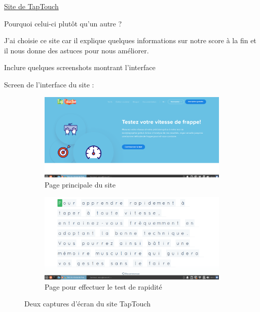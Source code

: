 \documentclass[12pt]{article}
\begin{document}
\href{https://www.taptouche.com/fr/test-de-vitesse}{Site de TapTouch}

\vspace{0.3cm}

Pourquoi celui-ci plutôt qu'un autre ?

\vspace{0.3cm}

J'ai choisie ce site car il explique quelques informations sur notre score à la fin et il nous donne des astuces pour nous améliorer.

\vspace{0.3cm}

Inclure quelques screenshots montrant l'interface

\vspace{0.3cm}

Screen de l'interface du site :

\vspace{0.3cm}

\begin{figure}[h]
  \centering
  \begin{subfigure}{0.45\textwidth}
    \centering
    \includegraphics[width=\textwidth]{Image-TD-2/image_site_tap_touche.png}
    \caption{Page principale du site}
  \end{subfigure}
  \vspace{0.9cm} %
  \begin{subfigure}{0.45\textwidth}
    \centering
    \includegraphics[width=\textwidth]{Image-TD-2/image_site_tap_touche2.png}
    \caption{Page pour effectuer le test de rapidité}
  \end{subfigure}
  \caption{Deux captures d'écran du site TapTouch}
\end{figure}
\end{document}
